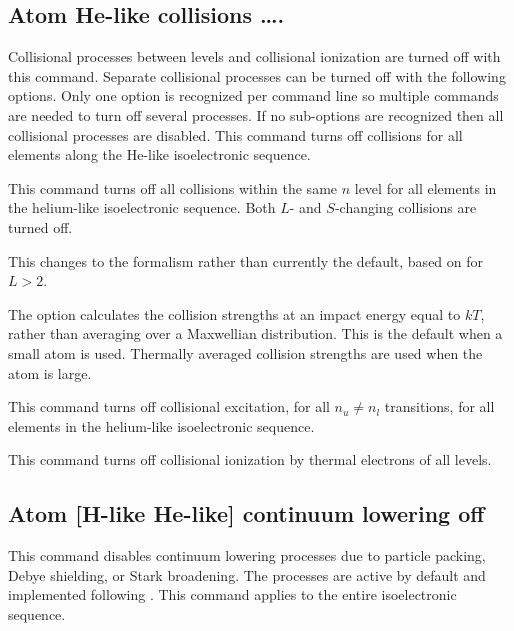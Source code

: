 \subsection{Atom He-like collisions \dots.}

Collisional processes between levels and collisional ionization are turned
off with this command.
Separate collisional processes can be turned off
with the following options.
Only one option is recognized per command line
so multiple commands are needed to turn off several processes.
If no
sub-options are recognized then all collisional processes are disabled.
This command turns off collisions for all elements along the He-like
isoelectronic sequence.

  This command
turns off all
collisions within the same $n$ level for all elements in the helium-like
isoelectronic sequence.
Both $L$- and $S$-changing collisions are turned off.

  This
changes to the \citet{PengellySeaton1964} formalism rather than
currently the default,
based on \citet{Vrinceanu2001} for $L > 2$.

The  option calculates the
\citet{Vrinceanu2001}
collision strengths at an impact energy equal to $kT$,
rather than averaging
over a Maxwellian distribution.
This is the default when a small atom is
used.
Thermally averaged collision strengths are used when the atom is
large.

  This command
turns off collisional
excitation, for all $n_u \not= n_l$ transitions,
for all elements in the helium-like
isoelectronic sequence.

This command turns off collisional
ionization by thermal electrons of all levels.

\subsection{Atom [H-like \OR{} He-like]  continuum lowering off }
This command disables continuum lowering processes due to particle packing,
Debye shielding, or Stark broadening.  The processes are active by default
and implemented following \citet{Bautista00}.  This command applies
to the entire isoelectronic sequence.

